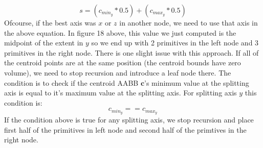 \documentclass[11pt,a4paper]{article}
\begin{document}
\begin{enumerate}
\begin{equation}
s=(c_{min_{y}} * 0.5) + (c_{max_{y}} * 0.5) 
\end{equation}
Ofcourse, if the best axis was $x$ or $z$ in another node, we need to use that axis in the above equation. In figure 18 above, this value we just computed is the midpoint of the extent in $y$ so we end up with 2 primitives in the left node and 3 primitives in the right node. There is one slight issue with this approach. If all of the centroid points are at the same position (the centroid bounds have zero volume), we need to stop recursion and introduce a leaf node there. The condition is to check if the centroid AABB $\boldsymbol{c}$'s minimum value at the splitting axis is equal to it's maximum value at the splitting axis. For splitting axis $y$ this condition is:
\begin{equation}
c_{min_{y}} == c_{max_{y}}
\end{equation}
If the condition above is true for any splitting axis, we stop recursion and place first half of the primitives in left node and second half of the primtives in the right node.
\end{enumerate}
\end{document}

